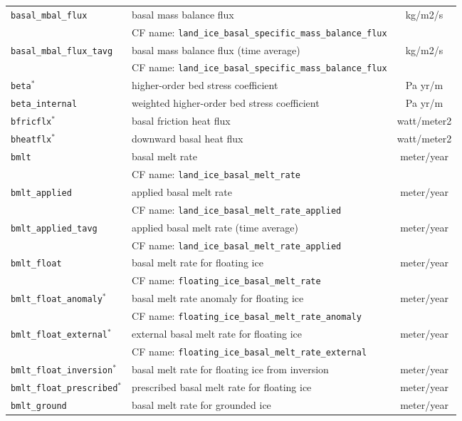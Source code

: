 \begin{center}
\begin{supertabular}{|l|p{8cm}|c|}
\hline
\texttt{basal\_mbal\_flux} & basal mass balance flux & kg/m2/s\\
&CF name: \texttt{land\_ice\_basal\_specific\_mass\_balance\_flux}&\\
\hline
\texttt{basal\_mbal\_flux\_tavg} & basal mass balance flux (time average) & kg/m2/s\\
&CF name: \texttt{land\_ice\_basal\_specific\_mass\_balance\_flux}&\\
\hline
\texttt{beta}$^\ast$ & higher-order bed stress coefficient & Pa yr/m\\
\hline
\texttt{beta\_internal} & weighted higher-order bed stress coefficient & Pa yr/m\\
\hline
\texttt{bfricflx}$^\ast$ & basal friction heat flux & watt/meter2\\
\hline
\texttt{bheatflx}$^\ast$ & downward basal heat flux & watt/meter2\\
\hline
\texttt{bmlt} & basal melt rate & meter/year\\
&CF name: \texttt{land\_ice\_basal\_melt\_rate}&\\
\hline
\texttt{bmlt\_applied} & applied basal melt rate & meter/year\\
&CF name: \texttt{land\_ice\_basal\_melt\_rate\_applied}&\\
\hline
\texttt{bmlt\_applied\_tavg} & applied basal melt rate (time average) & meter/year\\
&CF name: \texttt{land\_ice\_basal\_melt\_rate\_applied}&\\
\hline
\texttt{bmlt\_float} & basal melt rate for floating ice & meter/year\\
&CF name: \texttt{floating\_ice\_basal\_melt\_rate}&\\
\hline
\texttt{bmlt\_float\_anomaly}$^\ast$ & basal melt rate anomaly for floating ice & meter/year\\
&CF name: \texttt{floating\_ice\_basal\_melt\_rate\_anomaly}&\\
\hline
\texttt{bmlt\_float\_external}$^\ast$ & external basal melt rate for floating ice & meter/year\\
&CF name: \texttt{floating\_ice\_basal\_melt\_rate\_external}&\\
\hline
\texttt{bmlt\_float\_inversion}$^\ast$ & basal melt rate for floating ice from inversion & meter/year\\
\hline
\texttt{bmlt\_float\_prescribed}$^\ast$ & prescribed basal melt rate for floating ice & meter/year\\
\hline
\texttt{bmlt\_ground} & basal melt rate for grounded ice & meter/year\\

\end{supertabular}
\end{center}
